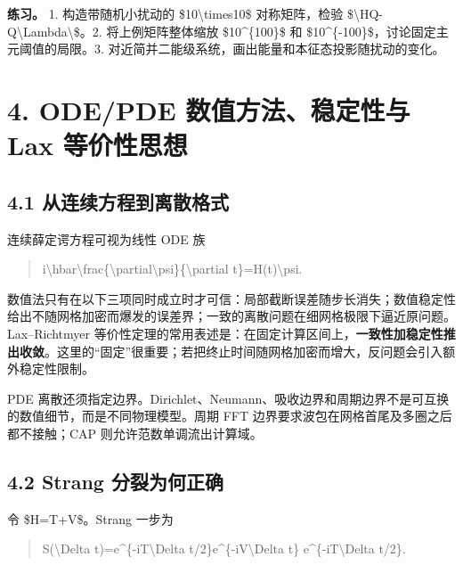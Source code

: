 \documentclass[UTF8,openany,11pt,fontset=fandol]{ctexbook}
\begin{document}
\textbf{练习。} 1. 构造带随机小扰动的 \$10\textbackslash times10\$
对称矩阵，检验
\$\textbackslash\textbar HQ-Q\textbackslash Lambda\textbackslash\textbar\$。2.
将上例矩阵整体缩放 \$10\^{}\{100\}\$ 和
\$10\^{}\{-100\}\$，讨论固定主元阈值的局限。3.
对近简并二能级系统，画出能量和本征态投影随扰动的变化。

\section{\texorpdfstring{\textbf{4. ODE/PDE 数值方法、稳定性与 Lax
等价性思想}}{4. ODE/PDE 数值方法、稳定性与 Lax 等价性思想}}\label{odepde-ux6570ux503cux65b9ux6cd5ux7a33ux5b9aux6027ux4e0e-lax-ux7b49ux4ef7ux6027ux601dux60f3}

\subsection{\texorpdfstring{\textbf{4.1
从连续方程到离散格式}}{4.1 从连续方程到离散格式}}\label{ux4eceux8fdeux7eedux65b9ux7a0bux5230ux79bbux6563ux683cux5f0f}

连续薛定谔方程可视为线性 ODE 族

\begin{quote}
i\textbackslash hbar\textbackslash frac\{\textbackslash partial\textbackslash psi\}\{\textbackslash partial
t\}=H(t)\textbackslash psi.
\end{quote}

数值法只有在以下三项同时成立时才可信：局部截断误差随步长消失；数值稳定性给出不随网格加密而爆发的误差界；一致的离散问题在细网格极限下逼近原问题。Lax--Richtmyer
等价性定理的常用表述是：在固定计算区间上，\textbf{一致性加稳定性推出收敛}。这里的``固定''很重要；若把终止时间随网格加密而增大，反问题会引入额外稳定性限制。

PDE
离散还须指定边界。Dirichlet、Neumann、吸收边界和周期边界不是可互换的数值细节，而是不同物理模型。周期
FFT 边界要求波包在网格首尾及多圈之后都不接触；CAP
则允许范数单调流出计算域。

\subsection{\texorpdfstring{\textbf{4.2 Strang
分裂为何正确}}{4.2 Strang 分裂为何正确}}\label{strang-ux5206ux88c2ux4e3aux4f55ux6b63ux786e}

令 \$H=T+V\$。Strang 一步为

\begin{quote}
S(\textbackslash Delta t)=e\^{}\{-iT\textbackslash Delta
t/2\}e\^{}\{-iV\textbackslash Delta t\} e\^{}\{-iT\textbackslash Delta
t/2\}.
\end{quote}
\end{document}
